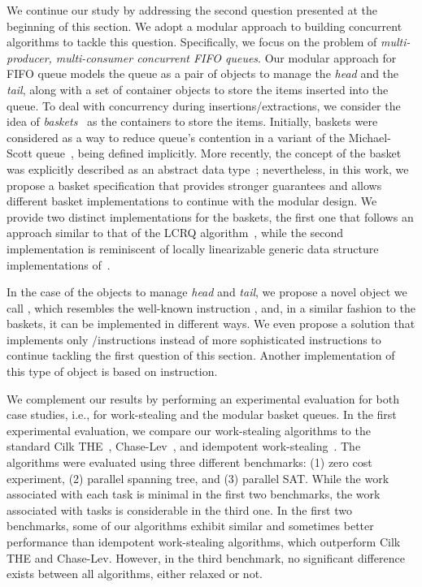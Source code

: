 We continue our study by addressing the second question presented at the beginning of this section. We adopt a modular approach to building concurrent algorithms to tackle this question. Specifically, we focus on the problem of \textit{multi-producer, multi-consumer concurrent FIFO queues}. Our modular approach for FIFO queue models the queue as a pair of objects to manage the \textit{head} and the \textit{tail}, along with a set of container objects to store the items inserted into the queue. To deal with concurrency during insertions/extractions, we consider the idea of \textit{baskets}~\cite{basketqueue2007} as the containers to store the items. Initially, baskets were considered as a way to reduce queue's \CAS contention in a variant of the Michael-Scott queue~\cite{DBLP_conf_podc_MichaelS96}, being defined implicitly. More recently, the concept of the basket was explicitly described as an abstract data type~\cite{scalingconcurrent2020}; nevertheless, in this work, we propose a basket specification that provides stronger guarantees and allows different basket implementations to continue with the modular design. We provide two distinct implementations for the baskets, the first one that follows an approach similar to that of the LCRQ algorithm~\cite{ppopp2013x86queues}, while the second implementation is reminiscent of locally linearizable generic data structure implementations of~\cite{DBLP_conf_concur_HaasHHKLPSSV16}.

In the case of the objects to manage \textit{head} and \textit{tail}, we propose a novel object we call \llic, which resembles the well-known instruction \llsc, and, in a similar fashion to the baskets, it can be implemented in different ways. We even propose a solution that implements only \R/\W instructions instead of more sophisticated \RMW instructions to continue tackling the first question of this section. Another implementation of this type of object is based on \CAS instruction.

 We complement our results by performing an experimental evaluation for both case studies, i.e., for work-stealing and the modular basket queues. In the first experimental evaluation, we compare our work-stealing algorithms to the standard Cilk THE~\cite{DBLP_conf_pldi_FrigoLR98}, Chase-Lev~\cite{circular.work.stealing}, and idempotent work-stealing~\cite{maged.vechev.2009}. The algorithms were evaluated using three different benchmarks: (1) zero cost experiment, (2) parallel spanning tree, and (3) parallel SAT. While the work associated with each task is minimal in the first two benchmarks, the work associated with tasks is considerable in the third one. In the first two benchmarks, some of our algorithms exhibit similar and sometimes better performance than idempotent work-stealing algorithms, which outperform Cilk THE and Chase-Lev. However, in the third benchmark, no significant difference exists between all algorithms, either relaxed or not.

